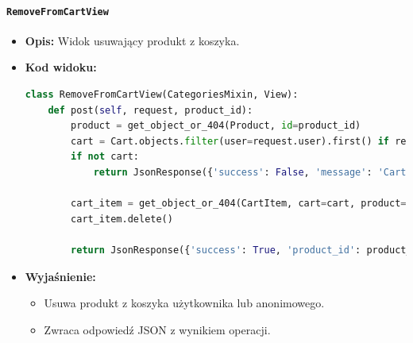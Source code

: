\documentclass[12pt,a4paper,oneside]{article}
\theoremstyle{definition}
\numberwithin{equation}{section}
\begin{document}
\paragraph{\texttt{RemoveFromCartView}}
\begin{itemize}
    \item \textbf{Opis:} Widok usuwający produkt z koszyka.
    \item \textbf{Kod widoku:}
\begin{lstlisting}[language=Python, caption=Kod widoku RemoveFromCartView]
class RemoveFromCartView(CategoriesMixin, View):
    def post(self, request, product_id):
        product = get_object_or_404(Product, id=product_id)
        cart = Cart.objects.filter(user=request.user).first() if request.user.is_authenticated else Cart.objects.filter(id=request.session.get('cart_id')).first()
        if not cart:
            return JsonResponse({'success': False, 'message': 'Cart not found'})

        cart_item = get_object_or_404(CartItem, cart=cart, product=product)
        cart_item.delete()

        return JsonResponse({'success': True, 'product_id': product_id})
\end{lstlisting}

    \item \textbf{Wyjaśnienie:}
    \begin{itemize}
        \item Usuwa produkt z koszyka użytkownika lub anonimowego.
        \item Zwraca odpowiedź JSON z wynikiem operacji.
    \end{itemize}
\end{itemize}
\end{document}
